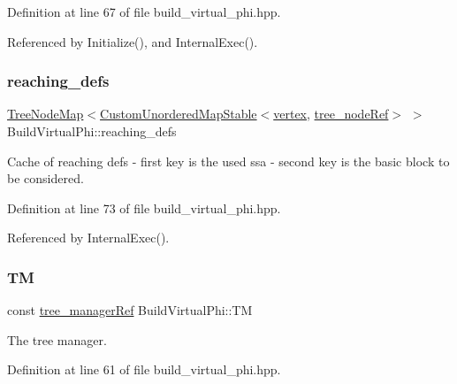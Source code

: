 Definition at line 67 of file build\+\_\+virtual\+\_\+phi.\+hpp.



Referenced by Initialize(), and Internal\+Exec().

\mbox{\label{classBuildVirtualPhi_af6b51aecd3ea976db404446be9978c55}} 
\subsubsection{\texorpdfstring{reaching\+\_\+defs}{reaching\_defs}}
{\footnotesize\ttfamily \hyperlink{classTreeNodeMap}{Tree\+Node\+Map}$<$\hyperlink{custom__map_8hpp_a7314a7df1cdb3a3acf478ab86e95c226}{Custom\+Unordered\+Map\+Stable}$<$\hyperlink{graph_8hpp_abefdcf0544e601805af44eca032cca14}{vertex}, \hyperlink{tree__node_8hpp_a6ee377554d1c4871ad66a337eaa67fd5}{tree\+\_\+node\+Ref}$>$ $>$ Build\+Virtual\+Phi\+::reaching\+\_\+defs\hspace{0.3cm}{\ttfamily [private]}}



Cache of reaching defs -\/ first key is the used ssa -\/ second key is the basic block to be considered. 



Definition at line 73 of file build\+\_\+virtual\+\_\+phi.\+hpp.



Referenced by Internal\+Exec().

\mbox{\label{classBuildVirtualPhi_a5e37981c5c3abb64b6c62a87f556f94d}} 
\subsubsection{\texorpdfstring{TM}{TM}}
{\footnotesize\ttfamily const \hyperlink{tree__manager_8hpp_a96ff150c071ce11a9a7a1e40590f205e}{tree\+\_\+manager\+Ref} Build\+Virtual\+Phi\+::\+TM\hspace{0.3cm}{\ttfamily [private]}}



The tree manager. 



Definition at line 61 of file build\+\_\+virtual\+\_\+phi.\+hpp.



